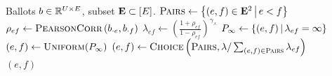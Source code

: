 \begin{algorithm}
\caption{Scheduler based on ballot correlations}\label{alg:scheduler}
\begin{algorithmic}
\Require Ballots $b \in \mathbb R^{U \times E}$, subset ${\bf E} \subset [E]$.
\State $\textsc{Pairs} \gets \left\lbrace (e, f) \in {\bf E}^2 \,\middle|\, e < f \right\rbrace$
    \State $\rho_{ef} \gets 
            \textsc{PearsonCorr} \left( b_{\cdot e}, b_{\cdot f} \right)$ 
    \State $\lambda_{ef} \gets \left( 
            \frac{1 + \rho_{ef}}{1 - \rho_{ef}} 
        \right)^{\gamma_{\curlywedge}}$ 
\EndFor
\State $P_\infty \gets \left\lbrace (e, f) \,\middle|\, \lambda_{ef} = \infty \right\rbrace$
    \State $(e, f) \gets \textsc{Uniform} (P_\infty)$
\Else{}
    \State $(e, f) \gets \textsc{Choice} \left(
        \textsc{Pairs}, \lambda / \sum_{(e,f) \in \textsc{Pairs}} \lambda_{ef} 
    \right)$
\EndIf \\
\Return $(e, f)$
\end{algorithmic}
\end{algorithm}


